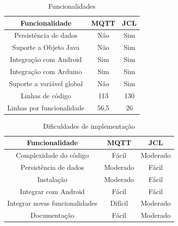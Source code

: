 \documentclass[12pt]{article}
\begin{document}

\begin{table}[]
	\caption{Funcionalidades}
	\centering
	\begin{tabular}{@{}ccc@{}}
		\toprule
		Funcionalidade             & MQTT & JCL \\ \midrule
		Persistência de dados     & Não & Sim \\
		Suporte a Objeto Java      & Não & Sim \\
		Integração com Android   & Sim  & Sim \\
		Integração com Arduino   & Sim  & Sim \\
		Suporte a variável global & Não & Sim \\
		Linhas de código          & 113  & 130 \\
		\midrule
		Linhas por funcionalidade  & 56,5 & 26  \\
		\bottomrule
	\end{tabular}
	\label{tab:funcs}
\end{table}

\begin{table}[]
	\caption{Dificuldades de implementação}
	\centering
	\begin{tabular}{@{}ccc@{}}
		\toprule
		Funcionalidade                 & MQTT     & JCL      \\ \midrule
		Complexidade do código        & Fácil   & Moderado \\
		Persistência de dados         & Moderado & Fácil   \\
		Instalação                   & Moderado & Fácil   \\
		Integrar com Android           & Fácil   & Fácil   \\
		Integrar novas funcionalidades & Difícil & Moderado \\
		Documentação                 & Fácil   & Moderado \\
		\bottomrule
	\end{tabular}
	\label{tab:level}
\end{table}





\end{document}
